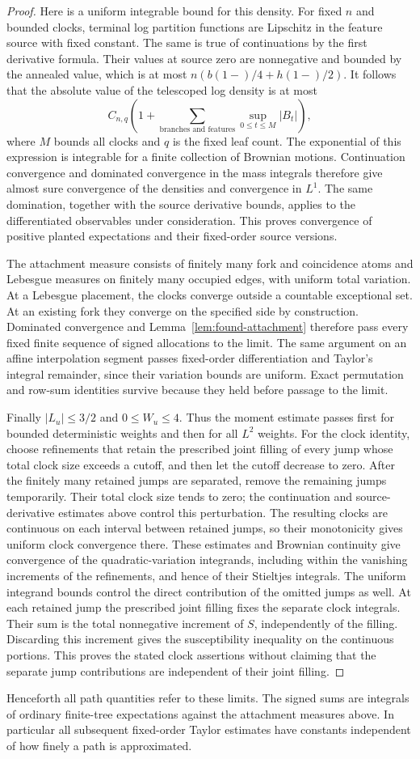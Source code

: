 \begin{proof}
Here is a uniform integrable bound for this density. For fixed $n$ and
bounded clocks, terminal log partition functions are Lipschitz in the
feature source with fixed constant. The same is true of continuations
by the first derivative formula. Their values at source zero are
nonnegative and bounded by the annealed value, which is at most
$n(b(1-)/4+h(1-)/2)$. It follows that the absolute value of the
telescoped log density is at most
\[
 C_{n,q}\left(1+\sum_{\text{branches and features}}
                      \sup_{0\leq t\leq M}|B_t|\right),
\]
where $M$ bounds all clocks and $q$ is the fixed leaf count. The
exponential of this expression is integrable for a finite collection
of Brownian motions. Continuation convergence and dominated convergence
in the mass integrals therefore give almost sure convergence of the
densities and convergence in $L^1$. The same domination, together with
the source derivative bounds, applies to the differentiated observables
under consideration. This proves convergence of positive planted
expectations and their fixed-order source versions.

The attachment measure consists of finitely many fork and coincidence
atoms and Lebesgue measures on finitely many occupied edges, with
uniform total variation. At a Lebesgue placement, the clocks converge
outside a countable exceptional set. At an existing fork they converge
on the specified side by construction. Dominated convergence and
Lemma~\ref{lem:found-attachment} therefore pass every fixed finite
sequence of signed allocations to the limit. The same argument on an
affine interpolation segment passes fixed-order differentiation and
Taylor's integral remainder, since their variation bounds are uniform.
Exact permutation and row-sum identities survive because they held
before passage to the limit.

Finally $|L_u|\leq3/2$ and $0\leq W_u\leq4$. Thus the moment estimate
passes first for bounded deterministic weights and then for all
$L^2$ weights. For the clock identity, choose refinements that retain the prescribed
joint filling of every jump whose total clock size exceeds a cutoff,
and then let the cutoff decrease to zero. After the finitely many retained
jumps are separated, remove the remaining jumps temporarily. Their total
clock size tends to zero; the continuation and source-derivative estimates
above control this perturbation. The resulting clocks are continuous on
each interval between retained jumps, so their monotonicity gives uniform
clock convergence there. These estimates and Brownian continuity give
convergence of the quadratic-variation integrands, including within the
vanishing increments of the refinements, and hence of their Stieltjes
integrals. The uniform integrand bounds control the direct contribution
of the omitted jumps as well. At each retained jump the
prescribed joint filling fixes the separate clock integrals. Their sum
is the total nonnegative increment of $S$, independently of the filling.
Discarding this increment gives the susceptibility inequality on the
continuous portions. This proves the stated clock assertions without
claiming that the separate jump contributions are independent of their
joint filling.
\end{proof}

Henceforth all path quantities refer to these limits. The signed sums
are integrals of ordinary finite-tree expectations against the
attachment measures above. In particular all subsequent fixed-order
Taylor estimates have constants independent of how finely a path is
approximated.
